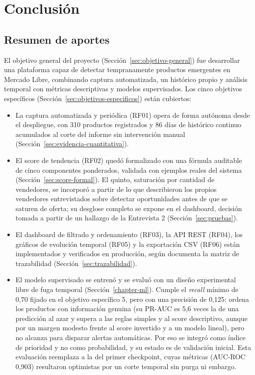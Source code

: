 \chapter{Conclusi\'on}\label{conclussions}

\section{Resumen de aportes}

El objetivo general del proyecto (Sección~\ref{sec:objetivo-general}) fue desarrollar una plataforma capaz de detectar tempranamente productos emergentes en Mercado Libre, combinando captura automatizada, un histórico propio y análisis temporal con métricas descriptivas y modelos supervisados. Los cinco objetivos específicos (Sección~\ref{sec:objetivos-especificos}) están cubiertos:

\begin{itemize}
	\item La captura automatizada y periódica (RF01) opera de forma autónoma desde el despliegue, con 310 productos registrados y 86 días de histórico continuo acumulados al corte del informe sin intervención manual (Sección~\ref{sec:evidencia-cuantitativa}).
	\item El score de tendencia (RF02) quedó formalizado con una fórmula auditable de cinco componentes ponderados, validada con ejemplos reales del sistema (Sección~\ref{sec:score-formal}). El quinto, saturación por cantidad de vendedores, se incorporó a partir de lo que describieron los propios vendedores entrevistados sobre detectar oportunidades antes de que se saturen de oferta; su desglose completo se expone en el dashboard, decisión tomada a partir de un hallazgo de la Entrevista 2 (Sección~\ref{sec:pruebas}).
	\item El dashboard de filtrado y ordenamiento (RF03), la API REST (RF04), los gráficos de evolución temporal (RF05) y la exportación CSV (RF06) están implementados y verificados en producción, según documenta la matriz de trazabilidad (Sección~\ref{sec:trazabilidad}).
	\item El modelo supervisado se entrenó y se evaluó con un diseño experimental libre de fuga temporal (Sección~\ref{chapter-ml}). Cumple el \emph{recall} mínimo de 0,70 fijado en el objetivo específico 5, pero con una precisión de 0,125: ordena los productos con información genuina (su PR-AUC es 5,6 veces la de una predicción al azar y supera a las reglas simples y al score descriptivo, aunque por un margen modesto frente al score invertido y a un modelo lineal), pero no alcanza para disparar alertas automáticas. Por eso se integró como índice de prioridad y no como probabilidad, y su estado es de validación inicial. Esta evaluación reemplaza a la del primer checkpoint, cuyas métricas (AUC-ROC 0,903) resultaron optimistas por un corte temporal sin purga ni embargo.
\end{itemize}

